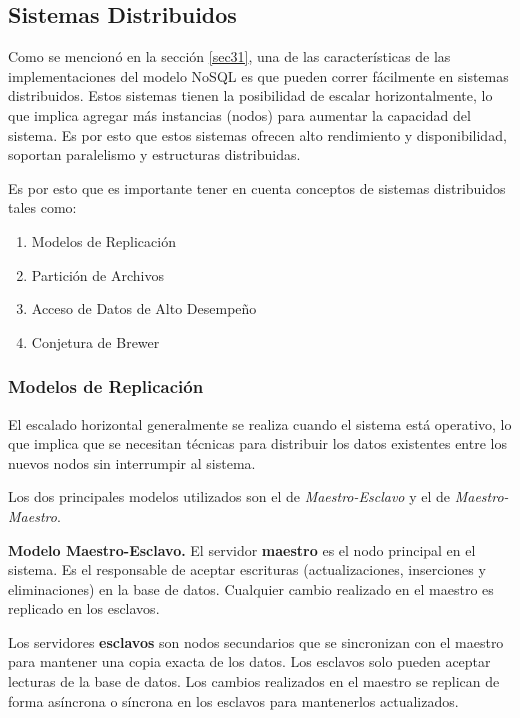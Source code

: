 \documentclass[pdflatex,sn-mathphys-num]{sn-jnl}
\theoremstyle{thmstyleone}%
\theoremstyle{thmstyletwo}%
\theoremstyle{thmstylethree}%
\begin{document}
\subsection{Sistemas Distribuidos}\label{sec32}

Como se mencionó en la sección \ref{sec31}, una de las características de las implementaciones del modelo NoSQL es que pueden correr fácilmente en sistemas distribuidos. Estos sistemas tienen la posibilidad de escalar horizontalmente, lo que implica agregar más instancias (nodos) para aumentar la capacidad del sistema. Es por esto que estos sistemas ofrecen alto rendimiento y disponibilidad, soportan paralelismo y estructuras distribuidas.

Es por esto que es importante tener en cuenta conceptos de sistemas distribuidos tales como: 

\begin{enumerate}
    \item Modelos de Replicación
    \item Partición de Archivos
    \item Acceso de Datos de Alto Desempeño
    \item Conjetura de Brewer
\end{enumerate}

\subsubsection{Modelos de Replicación}\label{sec321}

El escalado horizontal generalmente se realiza cuando el sistema está operativo, lo que implica que se necesitan técnicas para distribuir los datos existentes entre los nuevos nodos sin interrumpir al sistema.

Los dos principales modelos utilizados son el de \textit{Maestro-Esclavo} y el de \textit{Maestro-Maestro}.

\vspace{0.1cm}

\noindent
\textbf{Modelo Maestro-Esclavo.} El servidor \textbf{maestro} es el nodo principal en el sistema. Es el responsable de aceptar escrituras (actualizaciones, inserciones y eliminaciones) en la base de datos. Cualquier cambio realizado en el maestro es replicado en los esclavos.

Los servidores \textbf{esclavos} son nodos secundarios que se sincronizan con el maestro para mantener una copia exacta de los datos. Los esclavos solo pueden aceptar lecturas de la base de datos. Los cambios realizados en el maestro se replican de forma asíncrona o síncrona en los esclavos para mantenerlos actualizados.
\end{document}
